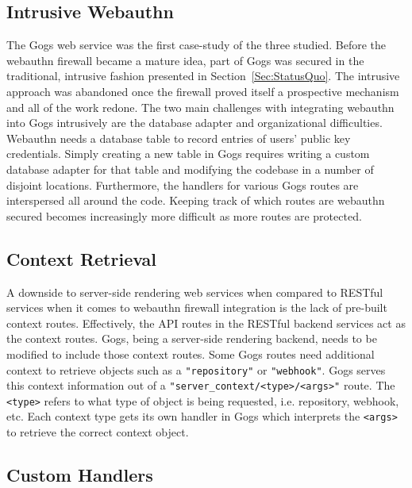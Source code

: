 \subsection{Intrusive Webauthn}

The Gogs web service was the first case-study of the three studied. Before the webauthn firewall became a mature idea, part of Gogs was secured in the traditional, intrusive fashion presented in Section~\ref{Sec:StatusQuo}. The intrusive approach was abandoned once the firewall proved itself a prospective mechanism and all of the work redone. The two main challenges with integrating webauthn into Gogs intrusively are the database adapter and organizational difficulties. Webauthn needs a database table to record entries of users' public key credentials. Simply creating a new table in Gogs requires writing a custom database adapter for that table and modifying the codebase in a number of disjoint locations. Furthermore, the handlers for various Gogs routes are interspersed all around the code. Keeping track of which routes are webauthn secured becomes increasingly more difficult as more routes are protected.

\subsection{Context Retrieval}

A downside to server-side rendering web services when compared to RESTful services when it comes to webauthn firewall integration is the lack of pre-built context routes. Effectively, the API routes in the RESTful backend services act as the context routes. Gogs, being a server-side rendering backend, needs to be modified to include those context routes. Some Gogs routes need additional context to retrieve objects such as a \lstinline{"repository"} or \lstinline{"webhook"}. Gogs serves this context information out of a \lstinline{"server_context/<type>/<args>"} route. The \lstinline{<type>} refers to what type of object is being requested, i.e. repository, webhook, etc. Each context type gets its own handler in Gogs which interprets the \lstinline{<args>} to retrieve the correct context object.


\subsection{Custom Handlers}


